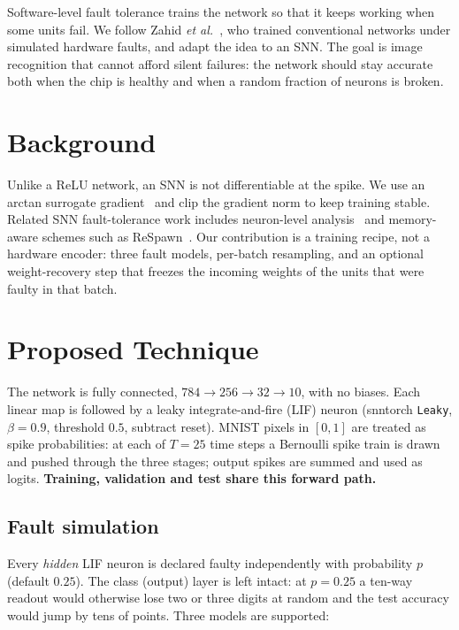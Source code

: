 \documentclass[conference]{IEEEtran}
\begin{document}
Software-level fault tolerance trains the network so that it keeps working
when some units fail. We follow Zahid \textit{et al.}~\cite{zahid2020fat},
who trained conventional networks under simulated hardware faults, and
adapt the idea to an SNN. The goal is image recognition that cannot afford
silent failures: the network should stay accurate both when the chip is
healthy and when a random fraction of neurons is broken.

\section{Background}

Unlike a ReLU network, an SNN is not differentiable at the spike. We use
an arctan surrogate gradient~\cite{eshraghian2023snn} and clip the
gradient norm to keep training stable. Related SNN fault-tolerance work
includes neuron-level analysis~\cite{spyrou2021nft} and memory-aware
schemes such as ReSpawn~\cite{putra2021respawn}. Our contribution is a
training recipe, not a hardware encoder: three fault models, per-batch
resampling, and an optional weight-recovery step that freezes the
incoming weights of the units that were faulty in that batch.

\section{Proposed Technique}

The network is fully connected, $784 \rightarrow 256 \rightarrow 32
\rightarrow 10$, with no biases. Each linear map is followed by a leaky
integrate-and-fire (LIF) neuron (snntorch \texttt{Leaky}, $\beta=0.9$,
threshold $0.5$, subtract reset). MNIST pixels in $[0,1]$ are treated as
spike probabilities: at each of $T=25$ time steps a Bernoulli spike train
is drawn and pushed through the three stages; output spikes are summed
and used as logits. \textbf{Training, validation and test share this
forward path.}

\subsection{Fault simulation}
Every \emph{hidden} LIF neuron is declared faulty independently with
probability $p$ (default $0.25$). The class (output) layer is left
intact: at $p=0.25$ a ten-way readout would otherwise lose two or three
digits at random and the test accuracy would jump by tens of points.
Three models are supported:
\end{document}
